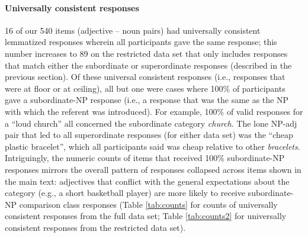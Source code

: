 \documentclass[doc]{apa6}
\begin{document}
\paragraph{Universally consistent responses}

16 of our 540 items (adjective -- noun pairs) had universally consistent lemmatized responses wherein all participants gave the same response; this number increases to 89 on the restricted data set that only includes responses that match either the subordinate or superordinate responses (described in the previous section). 
Of these universal consistent responses (i.e., responses that were at floor or at ceiling), all but one were cases where 100\% of participants gave a subordinate-NP response (i.e., a response that was the same as the NP with which the referent was introduced). 
For example, 100\% of valid responses for a ``loud church'' all concerned the subordinate category \emph{church}. 
The lone NP-adj pair that led to all superordinate responses (for either data set) was the ``cheap plastic bracelet'', which all participants said was cheap relative to other \emph{bracelets}. 
Intriguingly, the numeric counts of items that received 100\% subordinate-NP responses mirrors the overall pattern of responses collapsed across items shown in the main text: adjectives that conflict with the general expectations about the category (e.g., a short basketball player) are more likely to receive subordinate-NP comparison class responses (Table \ref{tab:counts} for counts of universally consistent responses from the full data set; Table \ref{tab:counts2} for universally consistent responses from the restricted data set). 
\end{document}

